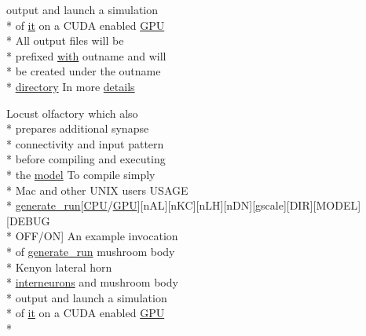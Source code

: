 \begin{DoxyCompactItemize}
output and launch a simulation \\*
of \hyperlink{userproject_2PoissonIzh__project_2README_8txt_a3e3bbb6c9b14c38757cf273a117e43e8}{it} on a C\+U\+D\+A enabled \hyperlink{modelSpec_8h_a39cb9803524b6f3b783344b2f89867b4}{G\+P\+U} \\*
All output files will be \\*
prefixed \hyperlink{userproject_2OneComp__project_2README_8txt_ace09bb40fbf4457ad9a9340a67a4fa9a}{with} outname and will \\*
be created under the outname \\*
\hyperlink{README_8txt_ae619b68020535fba5ac79522a0d9d1c4}{directory} In more \hyperlink{userproject_2MBody1__project_2README_8txt_a13ece3471fd6716c3062972374285e7d}{details}
\item 
Locust olfactory which also \\*
prepares additional synapse \\*
connectivity and input pattern \\*
before compiling and executing \\*
the \hyperlink{README_8txt_a69fd801b7213948c12d9dd7eebb3ed14}{model} To compile simply \\*
Mac and other U\+N\+I\+X users U\+S\+A\+G\+E \\*
\hyperlink{userproject_2MBody__userdef__project_2README_8txt_a320a215d1e27b4de394be70e90d22863}{generate\+\_\+run}\mbox{[}\hyperlink{README_8txt_a74a069e3c75797de2636c4dd14daa147}{C\+P\+U}/\hyperlink{modelSpec_8h_a39cb9803524b6f3b783344b2f89867b4}{G\+P\+U}\mbox{]}\mbox{[}n\+A\+L\mbox{]}\mbox{[}n\+K\+C\mbox{]}\mbox{[}n\+L\+H\mbox{]}\mbox{[}n\+D\+N\mbox{]}\mbox{[}gscale\mbox{]}\mbox{[}D\+I\+R\mbox{]}\mbox{[}M\+O\+D\+E\+L\mbox{]}\mbox{[}D\+E\+B\+U\+G \\*
O\+F\+F/O\+N\mbox{]} An example invocation \\*
of \hyperlink{userproject_2MBody__userdef__project_2README_8txt_a320a215d1e27b4de394be70e90d22863}{generate\+\_\+run} mushroom body \\*
Kenyon lateral horn \\*
\hyperlink{userproject_2SynDelay__project_2README_8txt_adf6327d22e2c11a62a22ab5afd4f2b81}{interneurons} and mushroom body \\*
output and launch a simulation \\*
of \hyperlink{userproject_2PoissonIzh__project_2README_8txt_a3e3bbb6c9b14c38757cf273a117e43e8}{it} on a C\+U\+D\+A enabled \hyperlink{modelSpec_8h_a39cb9803524b6f3b783344b2f89867b4}{G\+P\+U} \\*

\end{DoxyCompactItemize}
